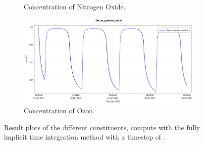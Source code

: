 \begin{figure}[H]
\begin{subfigure}{0.5\textwidth}
        \caption{Concentration of Nitrogen Oxide.}
    \end{subfigure}
    \begin{subfigure}{0.5\textwidth}
        \includegraphics[width=\textwidth]{figures/ozon_dt0d5.pdf}
        \caption{Concentration of Ozon.}
    \end{subfigure}
    \caption{Result plots of the different constituents, compute with the fully implicit time integration method with a timestep of .}
\end{figure}

